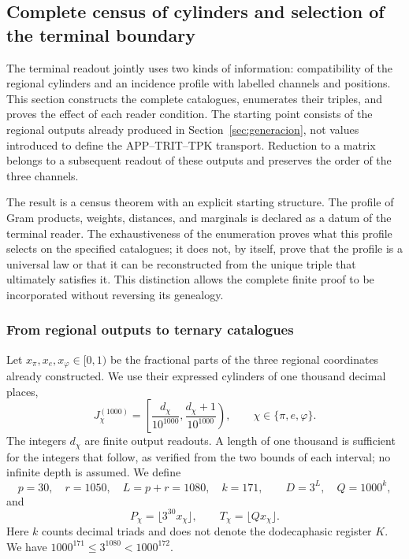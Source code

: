 \subsection{Complete census of cylinders and selection of the terminal boundary}
\label{censo:terminal-completo}

The terminal readout jointly uses two kinds of information: compatibility
of the regional cylinders and an incidence profile with labelled channels and
positions. This section constructs the complete catalogues,
enumerates their triples, and proves the effect of each reader condition.
The starting point consists of the regional outputs already produced in
Section~\ref{sec:generacion}, not values introduced to define
the APP--TRIT--TPK transport. Reduction to a matrix belongs to a subsequent
readout of these outputs and preserves the order of the three channels.

The result is a census theorem with an explicit starting structure.
The profile of Gram products, weights, distances, and marginals is declared as a datum of the
terminal reader. The exhaustiveness of the enumeration proves what
this profile selects on the specified catalogues; it does not, by itself, prove that the
profile is a universal law or that it can be reconstructed from the unique triple
that ultimately satisfies it. This distinction allows the complete finite
proof to be incorporated without reversing its genealogy.

\subsubsection{From regional outputs to ternary catalogues}

Let \(x_\pi,x_e,x_\varphi\in[0,1)\) be the fractional parts of the
three regional coordinates already constructed. We use their expressed
cylinders of one thousand decimal places,
\[
 J_\chi^{(1000)}=
 \left[\frac{d_\chi}{10^{1000}},
       \frac{d_\chi+1}{10^{1000}}\right),
 \qquad \chi\in\{\pi,e,\varphi\}.
\]
The integers \(d_\chi\) are finite output readouts. A length of one thousand
is sufficient for the integers that follow, as verified from the
two bounds of each interval; no infinite depth is assumed.
We define
\begin{equation}
 p=30,\quad r=1050,\quad L=p+r=1080,\quad k=171,
 \qquad D=3^L,\quad Q=1000^k,
 \label{censo:parametros}
\end{equation}
and
\[
 P_\chi=\lfloor3^{30}x_\chi\rfloor,\qquad
 T_\chi=\lfloor Qx_\chi\rfloor.
\]
Here \(k\) counts decimal triads and does not denote the dodecaphasic register
\(K\). We have \(1000^{171}\leq3^{1080}<1000^{172}\).

